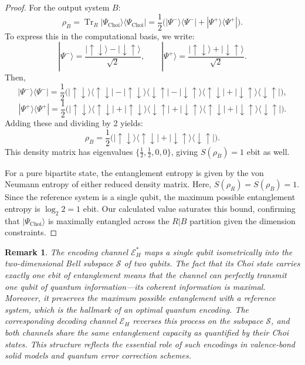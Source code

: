 \documentclass[12pt,a4paper]{article}
\newtheorem{remark}[theorem]{Remark}
\begin{document}
\begin{proof}
For the output system $B$:
\[
\rho_B = \operatorname{Tr}_R |\Psi_{\mathrm{Choi}}\rangle\langle\Psi_{\mathrm{Choi}}|
= \frac{1}{2}\bigl( |\Psi^-\rangle\langle\Psi^-| + |\Psi^+\rangle\langle\Psi^+| \bigr).
\]
To express this in the computational basis, we write:
\[
|\Psi^-\rangle = \frac{|\uparrow\downarrow\rangle-|\downarrow\uparrow\rangle}{\sqrt{2}}, \qquad
|\Psi^+\rangle = \frac{|\uparrow\downarrow\rangle+|\downarrow\uparrow\rangle}{\sqrt{2}}.
\]
Then,
\[
|\Psi^-\rangle\langle\Psi^-| = \frac{1}{2}\bigl(|\uparrow\downarrow\rangle\langle\uparrow\downarrow| - |\uparrow\downarrow\rangle\langle\downarrow\uparrow| - |\downarrow\uparrow\rangle\langle\uparrow\downarrow| + |\downarrow\uparrow\rangle\langle\downarrow\uparrow|\bigr),
\]
\[
|\Psi^+\rangle\langle\Psi^+| = \frac{1}{2}\bigl(|\uparrow\downarrow\rangle\langle\uparrow\downarrow| + |\uparrow\downarrow\rangle\langle\downarrow\uparrow| + |\downarrow\uparrow\rangle\langle\uparrow\downarrow| + |\downarrow\uparrow\rangle\langle\downarrow\uparrow|\bigr).
\]
Adding these and dividing by 2 yields:
\[
\rho_B = \frac{1}{2}\bigl( |\uparrow\downarrow\rangle\langle\uparrow\downarrow| + |\downarrow\uparrow\rangle\langle\downarrow\uparrow| \bigr).
\]
This density matrix has eigenvalues $\{\tfrac12, \tfrac12, 0, 0\}$, giving $S(\rho_B) = 1$ ebit as well.



For a pure bipartite state, the entanglement entropy is given by the von Neumann entropy of either reduced density matrix. Here, $S(\rho_R) = S(\rho_B) = 1$. Since the reference system is a single qubit, the maximum possible entanglement entropy is $\log_2 2 = 1$ ebit. Our calculated value saturates this bound, confirming that $|\Psi_{\mathrm{Choi}}\rangle$ is maximally entangled across the $R|B$ partition given the dimension constraints.
\end{proof}

 \begin{remark}
The encoding channel $\mathcal{E}_H^*$ maps a single qubit isometrically into the two-dimensional Bell subspace $\mathcal{S}$ of two qubits. The fact that its Choi state carries exactly one ebit of entanglement means that the channel can perfectly transmit one qubit of quantum information—its coherent information is maximal. Moreover, it preserves the maximum possible entanglement with a reference system, which is the hallmark of an optimal quantum encoding. The corresponding decoding channel $\mathcal{E}_H$ reverses this process on the subspace $\mathcal{S}$, and both channels share the same entanglement capacity as quantified by their Choi states. This structure reflects the essential role of such encodings in valence-bond solid models and quantum error correction schemes.
\end{remark}
\end{document}
